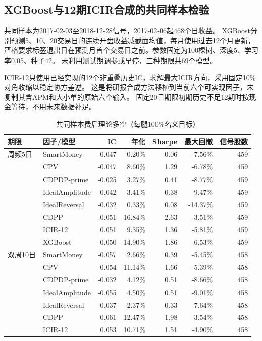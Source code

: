 \documentclass[UTF8,zihao=-4,fontset=fandol]{ctexart}
\renewcommand{\arraystretch}{1.25}
\begin{document}
\clearpage
\subsection{XGBoost与12期ICIR合成的共同样本检验}
共同样本为2017-02-03至2018-12-28信号，2017-02-06起468个日收益。
XGBoost分别预测5、10、20交易日的连续开盘收益减截面均值，每月使用过去12个月更新，
严格要求标签退出日在预测月首个交易日之前。参数固定为100棵树、深度5、学习率0.05、种子42。
未利用测试期调参或早停，三种期限共69个模型。

ICIR-12只使用已经实现的12个非重叠历史IC，求解最大ICIR方向，采用固定10\%对角收缩以稳定协方差逆。
这是将研报合成方法移植到当前六个可实现因子，未复制其含APM和大小单的原始六个输入。
固定20日期限初期历史不足12期时按现金等待，不用未来数据补足。

\begin{table}[H]\centering\footnotesize
\caption{共同样本费后理论多空（每腿100\%名义目标）}
\setlength{\tabcolsep}{4pt}\renewcommand{\arraystretch}{1.05}
\begin{tabular}{llrrrrr}\toprule
期限 & 因子/模型 & IC & 年化 & Sharpe & 最大回撤 & 信号股数\\\midrule
周频5日 & SmartMoney & -0.047 & 0.20\% & 0.06 & -7.56\% & 459 \\
 & CPV & -0.047 & 8.60\% & 1.29 & -6.78\% & 459 \\
 & CDPDP-prime & -0.025 & 3.27\% & 0.41 & -8.77\% & 459 \\
 & IdealAmplitude & -0.042 & 3.41\% & 0.38 & -9.47\% & 459 \\
 & IdealReversal & -0.032 & 0.33\% & 0.08 & -14.37\% & 459 \\
 & CDPP & -0.051 & 16.84\% & 2.63 & -3.51\% & 459 \\
 & ICIR-12 & 0.051 & 9.35\% & 1.36 & -5.81\% & 459 \\
\rowcolor{blue!7}
 & XGBoost & 0.050 & 14.90\% & 1.86 & -6.53\% & 459 \\
\midrule
双周10日 & SmartMoney & -0.057 & 2.66\% & 0.39 & -5.45\% & 458 \\
 & CPV & -0.054 & 11.14\% & 1.66 & -5.39\% & 458 \\
 & CDPDP-prime & -0.032 & 4.12\% & 0.51 & -8.66\% & 458 \\
 & IdealAmplitude & -0.055 & 4.50\% & 0.51 & -9.01\% & 458 \\
 & IdealReversal & -0.037 & 2.37\% & 0.33 & -7.64\% & 458 \\
 & CDPP & -0.061 & 12.47\% & 1.98 & -3.54\% & 458 \\
 & ICIR-12 & 0.053 & 10.71\% & 1.51 & -4.90\% & 458 \\

\end{tabular}
\end{table}
\end{document}
